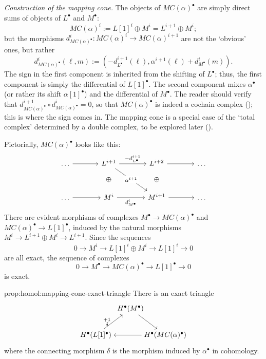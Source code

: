 \emph{Construction of the mapping cone.} The objects of
$MC(\alpha)^\bullet$ are simply direct sums of objects of $L^\bullet$
and $M^\bullet$:
\[
  MC(\alpha)^i := L[1]^i \oplus M^i = L^{i+1} \oplus M^i;
\]
but the morphisms
$d^i_{MC(\alpha)^\bullet} : MC(\alpha)^i \to MC(\alpha)^{i+1}$ are not
the `obvious' ones, but rather
\[
  d^i_{MC(\alpha)^\bullet}(\ell, m) := (-d^{i+1}_{L^\bullet}(\ell),
  \alpha^{i+1}(\ell) + d^i_{M^\bullet}(m)).
\]
The sign in the first component is inherited from the shifting of
$L^\bullet$; thus, the first component is simply the differential of
$L[1]^\bullet$. The second component mixes $\alpha^\bullet$ (or rather
its shift $\alpha[1]^\bullet$) and the differential of
$M^\bullet$. The reader should verify that
$d^{i+1}_{MC(\alpha)^\bullet} \circ d^i_{MC(\alpha)^\bullet} = 0$, so
that $MC(\alpha)^\bullet$ is indeed a cochain complex
(); this is where the
sign comes in. The mapping cone is a special case of the `total
complex' determined by a double complex, to be explored later
().

Pictorially, $MC(\alpha)^\bullet$ looks like this:
\[\begin{tikzcd}[column sep=large, row sep=small]
    \dots \arrow[r] & L^{i+1} \arrow[r, "-d^{i+1}_{L^\bullet}"] &
    L^{i+2} \arrow[r] & \dots \\
    & \oplus & \oplus & \\
    \dots \arrow[r] & M^i \arrow[r, "d^i_{M^\bullet}"'] & M^{i+1}
    \arrow[r] & \dots \arrow[from=1-2, to=3-3, "\alpha^{i+1}"
    description]
  \end{tikzcd}\] There are evident morphisms of complexes
$M^\bullet \to MC(\alpha)^\bullet$ and
$MC(\alpha)^\bullet \to L[1]^\bullet$, induced by the natural
morphisms
$M^i \longrightarrow L^{i+1} \oplus M^i \longrightarrow
L^{i+1}$. Since the sequences
\[
  0 \longrightarrow M^i \longrightarrow L[1]^i \oplus M^i
  \longrightarrow L[1]^i \longrightarrow 0
\]
are all exact, the sequence of complexes
\[
  0 \longrightarrow M^\bullet \longrightarrow MC(\alpha)^\bullet
  \longrightarrow L[1]^\bullet \longrightarrow 0
\]
is exact.
\begin{prop}{}{prop:homol:mapping-cone-exact-triangle}
  There is an exact triangle
  \[
    \begin{tikzpicture}[baseline=(current bounding box.center)]
      \node (M) at (1.7,1.3)
      {$H^\bullet(M^\bullet)$}; \node (L) at (0,0)
      {$H^\bullet(L[1]^\bullet)$}; \node (C) at (3.4,0)
      {$H^\bullet(MC(\alpha)^\bullet)$}; \draw[->] (M) -- (C);
      \draw[->] (C) -- (L); \draw[->] (L) -- (M) node[midway, left]
      {$\substack{+1 \\ \delta}$};
    \end{tikzpicture}
  \]
  where the connecting morphism $\delta$ is the morphism induced by
  $\alpha^\bullet$ in cohomology.
\end{prop}

